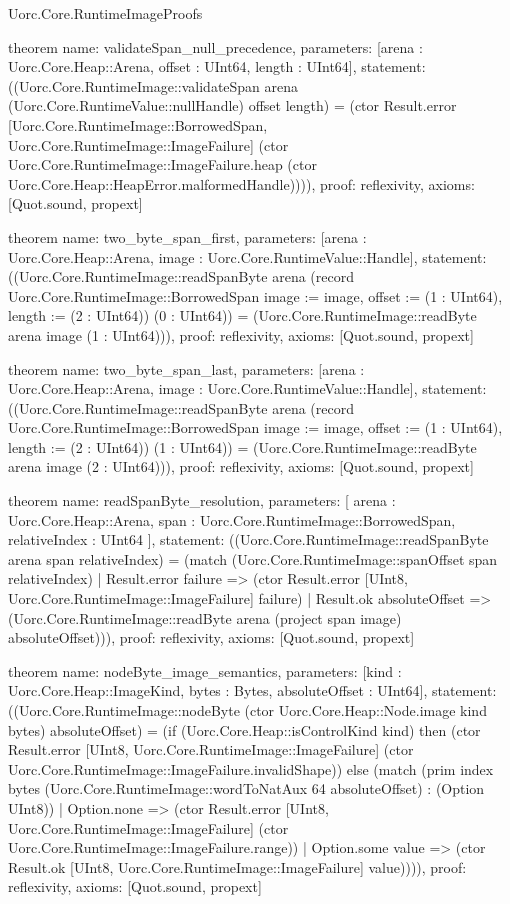 \begin{lexlean}{Uorc.Core.RuntimeImageProofs}
\begin{semanticmodule}
theorem{
  name: validateSpan_null_precedence,
  parameters: [arena : Uorc.Core.Heap::Arena, offset : UInt64, length : UInt64],
  statement: ((Uorc.Core.RuntimeImage::validateSpan arena (Uorc.Core.RuntimeValue::nullHandle) offset length) = (ctor Result.error [Uorc.Core.RuntimeImage::BorrowedSpan, Uorc.Core.RuntimeImage::ImageFailure] (ctor Uorc.Core.RuntimeImage::ImageFailure.heap (ctor Uorc.Core.Heap::HeapError.malformedHandle)))),
  proof: reflexivity{},
  axioms: [Quot.sound, propext]
}

theorem{
  name: two_byte_span_first,
  parameters: [arena : Uorc.Core.Heap::Arena, image : Uorc.Core.RuntimeValue::Handle],
  statement: ((Uorc.Core.RuntimeImage::readSpanByte arena (record Uorc.Core.RuntimeImage::BorrowedSpan {image := image, offset := (1 : UInt64), length := (2 : UInt64)}) (0 : UInt64)) = (Uorc.Core.RuntimeImage::readByte arena image (1 : UInt64))),
  proof: reflexivity{},
  axioms: [Quot.sound, propext]
}

theorem{
  name: two_byte_span_last,
  parameters: [arena : Uorc.Core.Heap::Arena, image : Uorc.Core.RuntimeValue::Handle],
  statement: ((Uorc.Core.RuntimeImage::readSpanByte arena (record Uorc.Core.RuntimeImage::BorrowedSpan {image := image, offset := (1 : UInt64), length := (2 : UInt64)}) (1 : UInt64)) = (Uorc.Core.RuntimeImage::readByte arena image (2 : UInt64))),
  proof: reflexivity{},
  axioms: [Quot.sound, propext]
}

theorem{
  name: readSpanByte_resolution,
  parameters: [
    arena : Uorc.Core.Heap::Arena,
    span : Uorc.Core.RuntimeImage::BorrowedSpan,
    relativeIndex : UInt64
  ],
  statement: ((Uorc.Core.RuntimeImage::readSpanByte arena span relativeIndex) = (match (Uorc.Core.RuntimeImage::spanOffset span relativeIndex)
    | Result.error failure => (ctor Result.error [UInt8, Uorc.Core.RuntimeImage::ImageFailure] failure)
    | Result.ok absoluteOffset => (Uorc.Core.RuntimeImage::readByte arena (project span image) absoluteOffset))),
  proof: reflexivity{},
  axioms: [Quot.sound, propext]
}

theorem{
  name: nodeByte_image_semantics,
  parameters: [kind : Uorc.Core.Heap::ImageKind, bytes : Bytes, absoluteOffset : UInt64],
  statement: ((Uorc.Core.RuntimeImage::nodeByte (ctor Uorc.Core.Heap::Node.image kind bytes) absoluteOffset) = (if (Uorc.Core.Heap::isControlKind kind) then (ctor Result.error [UInt8, Uorc.Core.RuntimeImage::ImageFailure] (ctor Uorc.Core.RuntimeImage::ImageFailure.invalidShape)) else (match (prim index bytes (Uorc.Core.RuntimeImage::wordToNatAux 64 absoluteOffset) : (Option UInt8))
    | Option.none => (ctor Result.error [UInt8, Uorc.Core.RuntimeImage::ImageFailure] (ctor Uorc.Core.RuntimeImage::ImageFailure.range))
    | Option.some value => (ctor Result.ok [UInt8, Uorc.Core.RuntimeImage::ImageFailure] value)))),
  proof: reflexivity{},
  axioms: [Quot.sound, propext]
}


\end{semanticmodule}
\end{lexlean}
